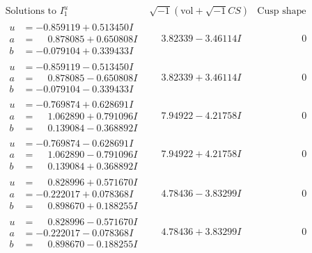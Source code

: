 \documentclass[1p]{elsarticle_modified}
\theoremstyle{definition}
\newcommand{\I}{\sqrt{-1}}
\begin{document}
$$\begin{array}{c|c|c}  
\text{Solutions to }I^u_{1}& \I (\text{vol} + \sqrt{-1}CS) & \text{Cusp shape}\\
 \hline 
\begin{aligned}
u &= -0.859119 + 0.513450 I \\
a &= \phantom{-}0.878085 + 0.650808 I \\
b &= -0.079104 + 0.339433 I\end{aligned}
 & \phantom{-}3.82339 - 3.46114 I & \phantom{-0.000000 } 0 \\ \hline\begin{aligned}
u &= -0.859119 - 0.513450 I \\
a &= \phantom{-}0.878085 - 0.650808 I \\
b &= -0.079104 - 0.339433 I\end{aligned}
 & \phantom{-}3.82339 + 3.46114 I & \phantom{-0.000000 } 0 \\ \hline\begin{aligned}
u &= -0.769874 + 0.628691 I \\
a &= \phantom{-}1.062890 + 0.791096 I \\
b &= \phantom{-}0.139084 - 0.368892 I\end{aligned}
 & \phantom{-}7.94922 - 4.21758 I & \phantom{-0.000000 } 0 \\ \hline\begin{aligned}
u &= -0.769874 - 0.628691 I \\
a &= \phantom{-}1.062890 - 0.791096 I \\
b &= \phantom{-}0.139084 + 0.368892 I\end{aligned}
 & \phantom{-}7.94922 + 4.21758 I & \phantom{-0.000000 } 0 \\ \hline\begin{aligned}
u &= \phantom{-}0.828996 + 0.571670 I \\
a &= -0.222017 + 0.078368 I \\
b &= \phantom{-}0.898670 + 0.188255 I\end{aligned}
 & \phantom{-}4.78436 - 3.83299 I & \phantom{-0.000000 } 0 \\ \hline\begin{aligned}
u &= \phantom{-}0.828996 - 0.571670 I \\
a &= -0.222017 - 0.078368 I \\
b &= \phantom{-}0.898670 - 0.188255 I\end{aligned}
 & \phantom{-}4.78436 + 3.83299 I & \phantom{-0.000000 } 0 \\ \hline\begin{aligned}

\end{aligned}
\end{array}$$
\end{document}
